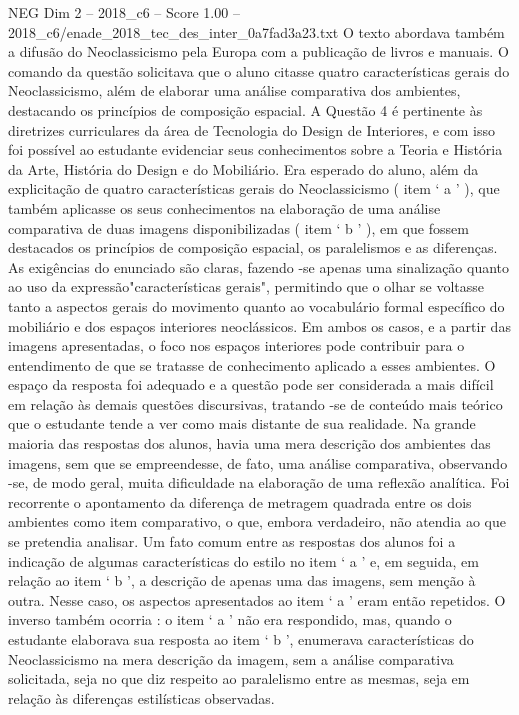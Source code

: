 \begin{textsample}{NEG Dim 2 – 2018\_c6 – Score 1.00 – 2018\_c6/enade\_2018\_tec\_des\_inter\_0a7fad3a23.txt}
O texto abordava também a difusão do Neoclassicismo pela Europa com a publicação de livros e manuais.
O comando da questão solicitava que o aluno citasse quatro características gerais do Neoclassicismo, além de elaborar uma análise comparativa dos ambientes, destacando os princípios de composição espacial.
A Questão 4 é pertinente às diretrizes curriculares da área de Tecnologia do Design de Interiores, e com isso foi possível ao estudante evidenciar seus conhecimentos sobre a Teoria e História da Arte, História do Design e do Mobiliário.
Era esperado do aluno, além da explicitação de quatro características gerais do Neoclassicismo ( item ‘ a ’ ), que também aplicasse os seus conhecimentos na elaboração de uma análise comparativa de duas imagens disponibilizadas ( item ‘ b ’ ), em que fossem destacados os princípios de composição espacial, os paralelismos e as diferenças.
As exigências do enunciado são claras, fazendo -se apenas uma sinalização quanto ao uso da expressão"características gerais", permitindo que o olhar se voltasse tanto a aspectos gerais do movimento quanto ao vocabulário formal específico do mobiliário e dos espaços interiores neoclássicos.
Em ambos os casos, e a partir das imagens apresentadas, o foco nos espaços interiores pode contribuir para o entendimento de que se tratasse de conhecimento aplicado a esses ambientes.
O espaço da resposta foi adequado e a questão pode ser considerada a mais difícil em relação às demais questões discursivas, tratando -se de conteúdo mais teórico que o estudante tende a ver como mais distante de sua realidade.
Na grande maioria das respostas dos alunos, havia uma mera descrição dos ambientes das imagens, sem que se empreendesse, de fato, uma análise comparativa, observando -se, de modo geral, muita dificuldade na elaboração de uma reflexão analítica.
Foi recorrente o apontamento da diferença de metragem quadrada entre os dois ambientes como item comparativo, o que, embora verdadeiro, não atendia ao que se pretendia analisar.
Um fato comum entre as respostas dos alunos foi a indicação de algumas características do estilo no item ‘ a ’ e, em seguida, em relação ao item ‘ b ’, a descrição de apenas uma das imagens, sem menção à outra.
Nesse caso, os aspectos apresentados ao item ‘ a ’ eram então repetidos.
O inverso também ocorria : o item ‘ a ’ não era respondido, mas, quando o estudante elaborava sua resposta ao item ‘ b ’, enumerava características do Neoclassicismo na mera descrição da imagem, sem a análise comparativa solicitada, seja no que diz respeito ao paralelismo entre as mesmas, seja em relação às diferenças estilísticas observadas.

\end{textsample}

